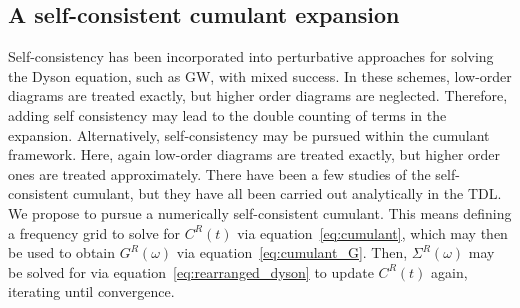 \documentclass[letterpaper]{article}
\begin{document}
\subsection{A self-consistent cumulant expansion}
Self-consistency has been incorporated into perturbative approaches for solving the Dyson equation, such as GW,
with mixed success. In these schemes, low-order diagrams are treated exactly, but higher order diagrams are neglected. Therefore, adding self consistency may lead to the double counting of terms in the expansion. Alternatively, self-consistency may be pursued within the cumulant framework. Here, again low-order diagrams are treated exactly, but higher order ones are treated approximately. There have been a few studies of the self-consistent cumulant, but they have all been carried out analytically in the TDL\cite{Holm1997-by,Robinson2022-wc,Dunn1975-ew}. We propose to pursue a numerically self-consistent cumulant. 
 This means defining a frequency grid to solve for $C^R(t)$ via equation~\ref{eq:cumulant}, which may then be used to obtain $G^R(\omega)$ via equation~\ref{eq:cumulant_G}. Then, $\Sigma^R(\omega)$ may be solved for via equation~\ref{eq:rearranged_dyson} to update $C^R(t)$ again, iterating until convergence.
\end{document}
